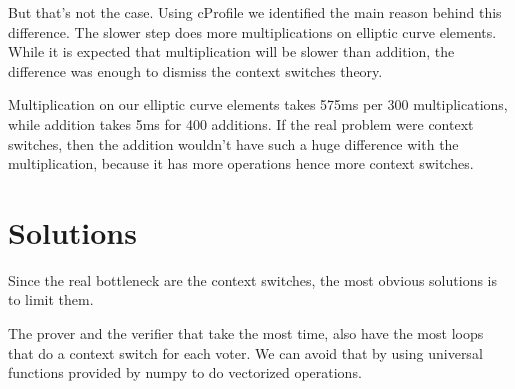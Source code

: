\documentclass{article}
\begin{document}
But that's not the case. Using cProfile we identified the main
reason behind this difference. The slower step does more multiplications on
elliptic curve elements. While it is expected that multiplication will be slower
than addition, the difference was enough to dismiss the context switches theory.

Multiplication on our elliptic curve elements takes 575ms per 300
multiplications, while addition takes 5ms for 400 additions. If the real
problem were context switches, then the addition wouldn't have such a huge
difference with the multiplication, because it has more operations hence
more context switches.


\section{Solutions}

Since the real bottleneck are the context switches, the most obvious
solutions is to limit them. 

The prover and the verifier that take the most time, also have the
most loops that do a context switch for each voter. We can avoid that
by using universal functions provided by numpy\cite{numpy} to do
vectorized operations.




\end{document}
